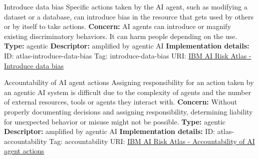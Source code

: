 \begin{definitionbox}{Introduce data bias}
Specific actions taken by the AI agent, such as modifying a dataset or a database, can introduce bias in the resource that gets used by others or by itself to take actions.\newline\newline
\textbf{Concern: }AI agents can introduce or magnify existing discriminatory behaviors. It can harm people depending on the use.\newline\newline
\textbf{Type: }agentic\newline
\textbf{Descriptor: }amplified by agentic AI \newline\newline
\textbf{Implementation details: } \newline
ID: atlas-introduce-data-bias \newline
Tag: introduce-data-bias \newline
URI:  \href{https://www.ibm.com/docs/en/watsonx/saas?topic=SSYOK8/wsj/ai-risk-atlas/introduce-data-bias.html}{IBM AI Risk Atlas - Introduce data bias}\newline
\end{definitionbox}
\begin{definitionbox}{Accountability of AI agent actions}
Assigning responsibility for an action taken by an agentic AI system is difficult due to the complexity of agents and the number of external resources, tools or agents they interact with.\newline\newline
\textbf{Concern: }Without properly documenting decisions and assigning responsibility, determining liability for unexpected behavior or misuse might not be possible.\newline\newline
\textbf{Type: }agentic\newline
\textbf{Descriptor: }amplified by agentic AI \newline\newline
\textbf{Implementation details: } \newline
ID: atlas-accountability \newline
Tag: accountability \newline
URI:  \href{https://www.ibm.com/docs/en/watsonx/saas?topic=SSYOK8/wsj/ai-risk-atlas/accountability.html}{IBM AI Risk Atlas - Accountability of AI agent actions}\newline
\end{definitionbox}
